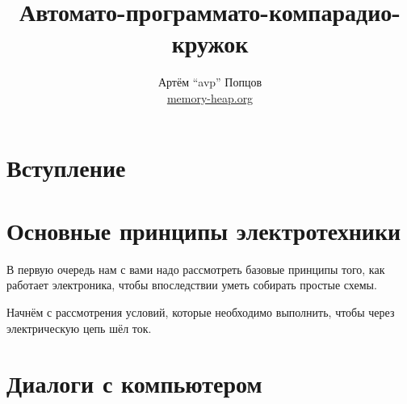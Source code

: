 \documentclass[a4paper,twoside]{book}
\title{Автомато-программато-компарадио-кружок}
\author{Артём ``avp'' Попцов\\\href{https://memory-heap.org}{memory-heap.org}}
\begin{document}
\maketitle

\tableofcontents

\chapter*{Вступление}



\chapter{Основные принципы электротехники}

В первую очередь нам с вами надо рассмотреть базовые принципы того, как работает
электроника, чтобы впоследствии уметь собирать простые схемы.

Начнём с рассмотрения условий, которые необходимо выполнить, чтобы через
электрическую цепь шёл ток.











\chapter{Диалоги с компьютером}
\label{chapter:dialogues-with-computer}
\end{document}
